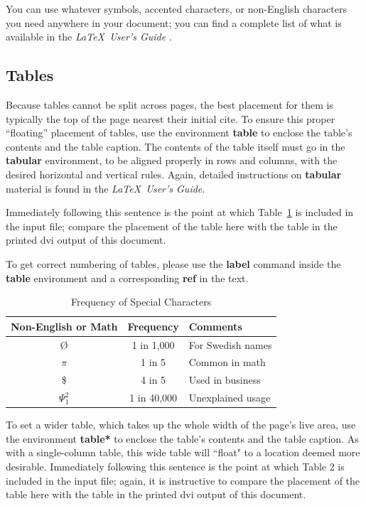 \documentclass{nime-alternate}
\begin{document}
You can use whatever symbols, accented characters, or
non-English characters you need anywhere in your document;
you can find a complete list of what is
available in the \textit{\LaTeX\
User's Guide} \cite{Lamport:LaTeX}.


\subsection{Tables}
Because tables cannot be split across pages, the best
placement for them is typically the top of the page
nearest their initial cite.  To
ensure this proper ``floating'' placement of tables, use the
environment \textbf{table} to enclose the table's contents and
the table caption.  The contents of the table itself must go
in the \textbf{tabular} environment, to
be aligned properly in rows and columns, with the desired
horizontal and vertical rules.  Again, detailed instructions
on \textbf{tabular} material
is found in the \textit{\LaTeX\ User's Guide}.

Immediately following this sentence is the point at which
Table~\ref{tab:frequency} is included in the input file; compare the
placement of the table here with the table in the printed
dvi output of this document. 

To get correct numbering of tables, please use the \textbf{label} command inside the \textbf{table} environment and a corresponding \textbf{ref} in the text.

\begin{table}
\centering
\caption{Frequency of Special Characters}
\begin{tabular}{|c|c|l|} \hline
Non-English or Math&Frequency&Comments\\ \hline
\O & 1 in 1,000& For Swedish names\\ \hline
$\pi$ & 1 in 5& Common in math\\ \hline
\$ & 4 in 5 & Used in business\\ \hline
$\Psi^2_1$ & 1 in 40,000& Unexplained usage\\
\hline\end{tabular}
\label{tab:frequency}
\end{table}

To set a wider table, which takes up the whole width of
the page's live area, use the environment
\textbf{table*} to enclose the table's contents and
the table caption.  As with a single-column table, this wide
table will ``float" to a location deemed more desirable.
Immediately following this sentence is the point at which
Table 2 is included in the input file; again, it is
instructive to compare the placement of the
table here with the table in the printed dvi
output of this document.
\end{document}
